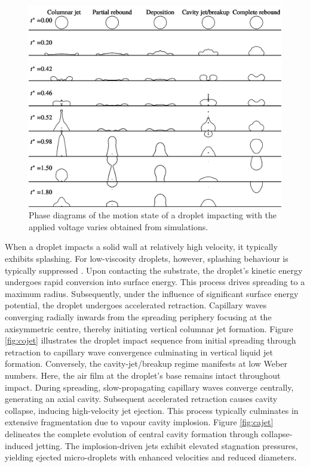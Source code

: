 \documentclass[lineno]{cls/jfm}
\begin{document}
 \begin{figure}
  \centerline{\includegraphics[width=1.0\textwidth]{fig/dropA.pdf}}
  \caption{Phase diagrams of the motion state of a droplet impacting with the applied voltage varies obtained from simulations.}
 \label{fig:dropA}
 \end{figure}
 
 When a droplet impacts a solid wall at relatively high velocity, it typically exhibits splashing. For low-viscosity droplets, however, splashing behaviour is typically suppressed \citep{jian_two_2018}. Upon contacting the substrate, the droplet's kinetic energy undergoes rapid conversion into surface energy. This process drives spreading to a maximum radius. Subsequently, under the influence of significant surface energy potential, the droplet undergoes accelerated retraction. Capillary waves converging radially inwards from the spreading periphery focusing at the axisymmetric centre, thereby initiating vertical columnar jet formation. Figure \ref{fig:cojet} illustrates the droplet impact sequence from initial spreading through retraction to capillary wave convergence culminating in vertical liquid jet formation. Conversely, the cavity-jet/breakup regime manifests at low Weber numbers. Here, the air film at the droplet's base remains intact throughout impact. During spreading, slow-propagating capillary waves converge centrally, generating an axial cavity. Subsequent accelerated retraction causes cavity collapse, inducing high-velocity jet ejection. This process typically culminates in extensive fragmentation due to vapour cavity implosion. Figure \ref{fig:cajet} delineates the complete evolution of central cavity formation through collapse-induced jetting. The implosion-driven jets exhibit elevated stagnation pressures, yielding ejected micro-droplets with enhanced velocities and reduced diameters.
\end{document}
